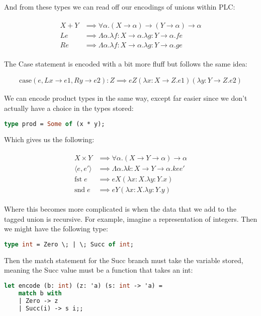 \documentclass{article}
\newcommand{\inlineeq}[1]{
    \vspace{-2em}
    \begin{gather*}
    #1
    \end{gather*}
    \vspace{-2em}
}
\begin{document}
And from these types we can read off our encodings of unions within PLC:

\inlineeq{
\begin{split}
X + Y &\implies \forall \alpha . (X \to \alpha ) \to (Y \to \alpha ) \to \alpha \\
L e &\implies \Lambda \alpha . \lambda f : X \to \alpha . \lambda g : Y \to \alpha . f e\\
R e &\implies \Lambda \alpha . \lambda f : X \to \alpha . \lambda g : Y \to \alpha . g e
\end{split}
}

The Case statement is encoded with a bit more fluff but follows the same idea:

\inlineeq{
\textrm{case}(e, L x \to e1, R y \to e2) : Z \implies e Z (\lambda x : X \to Z. e1) (\lambda y : Y \to Z. e2)
}

We can encode product types in the same way, except far easier since we don't actually have a choice in the types stored:

\begin{lstlisting}[language=ML]
type prod = Some of (x * y);
\end{lstlisting}

Which gives us the following:

\inlineeq{
\begin{split}
X \times Y &\implies \forall \alpha . (X \to Y \to \alpha ) \to \alpha \\
\langle e, e'\rangle  &\implies \Lambda \alpha . \lambda k : X \to Y \to \alpha . k e e'\\
\textrm{fst} \; e &\implies e X (\lambda x : X. \lambda y : Y. x)\\
\textrm{snd} \; e &\implies e Y (\lambda x : X. \lambda y : Y. y)
\end{split}
}

Where this becomes more complicated is when the data that we add to the tagged union is recursive. For example, imagine a representation of integers. Then we might have the following type:

\begin{lstlisting}[language=ML]
type int = Zero \; | \; Succ of int;
\end{lstlisting}

Then the match statement for the Succ branch must take the variable stored, meaning the Succ value must be a function that takes an int:

\begin{lstlisting}[language=ML]
let encode (b: int) (z: 'a) (s: int -> 'a) = 
	match b with
	| Zero -> z
	| Succ(i) -> s i;;
\end{lstlisting}
\end{document}
